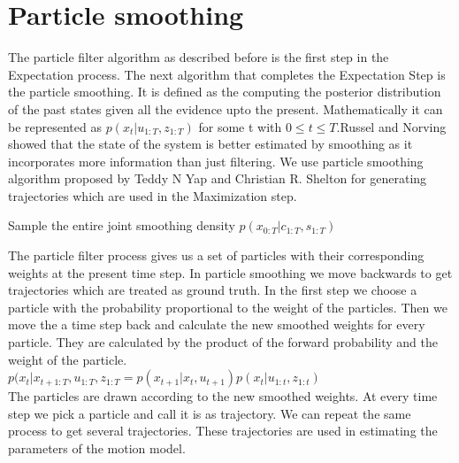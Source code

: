 \documentclass[12pt]{dalcsthesis}
\begin{document}
\section{Particle smoothing}
The particle filter algorithm as described before is the first step in the Expectation process. The next algorithm that completes the Expectation Step is the particle smoothing. It is defined as the computing the posterior distribution of the past states given all the evidence upto the present.
Mathematically it can be represented as $p(x _{t}|u _{1:T},z _{1:T})$ for some t with $ 0 \leq t \leq T$.Russel and Norving showed that the state of the system is better estimated by smoothing as it incorporates more information than just filtering.
We use particle smoothing algorithm proposed by Teddy N Yap and Christian R. Shelton for generating trajectories which are used in the Maximization step. 
\begin{algorithm}[H]
 \SetAlgoLined
  		 
	\caption{Sample the entire joint smoothing density $p(x_{0:T}|c_{1:T},s_{1:T})$}
	
\end{algorithm}

The particle filter process gives us a set of particles with their corresponding weights at the present time step. In particle smoothing we move backwards to get trajectories which are treated as ground truth. In the first step we choose a particle with the probability proportional to the weight of the particles. Then we move the a time step back and calculate the new smoothed weights for every particle. They are calculated by the product of the forward probability and the weight of the particle. 
\\
$ p(x_{t}|x_{t+1:T},u_{1:T},z_{1:T}=p(x_{t+1}|x_{t},u_{t+1})p(x_{t}|u_{1:t},z_{1:t})$
\\
The particles are drawn according to the new smoothed weights. At every time step we pick a particle and call it is as trajectory. We can repeat the same process to get several trajectories. These trajectories are used in estimating the parameters of the motion model.
 
\end{document}

